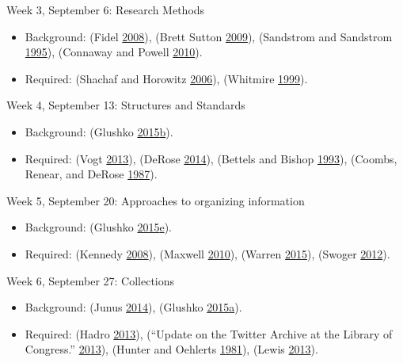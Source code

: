 \documentclass[]{article}
\providecommand{\tightlist}{%
  \setlength{\itemsep}{0pt}\setlength{\parskip}{0pt}}
\begin{document}
Week 3, September 6: Research Methods

\begin{itemize}
\tightlist
\item
  Background: (Fidel
  \protect\hyperlink{ref-fidelux5fareux5f2008}{2008}), (Brett Sutton
  \protect\hyperlink{ref-brettux5fsuttonux5fqualitativeux5f2009}{2009}),
  (Sandstrom and Sandstrom
  \protect\hyperlink{ref-sandstromux5fuseux5f1995}{1995}), (Connaway and
  Powell \protect\hyperlink{ref-connawayux5fselectingux5f2010}{2010}).
\item
  Required: (Shachaf and Horowitz
  \protect\hyperlink{ref-shachafux5fareux5f2006}{2006}), (Whitmire
  \protect\hyperlink{ref-whitmireux5fracialux5f1999}{1999}).
\end{itemize}

Week 4, September 13: Structures and Standards

\begin{itemize}
\tightlist
\item
  Background: (Glushko
  \protect\hyperlink{ref-glushkoux5fdescribingux5f2015}{2015}\protect\hyperlink{ref-glushkoux5fdescribingux5f2015}{b}).
\item
  Required: (Vogt
  \protect\hyperlink{ref-vogtux5fescienceux5f2013}{2013}), (DeRose
  \protect\hyperlink{ref-deroseux5fwhatux5f2014}{2014}), (Bettels and
  Bishop \protect\hyperlink{ref-bettelsux5funicode:ux5f1993}{1993}),
  (Coombs, Renear, and DeRose
  \protect\hyperlink{ref-coombsux5fmarkupux5f1987}{1987}).
\end{itemize}

Week 5, September 20: Approaches to organizing information

\begin{itemize}
\tightlist
\item
  Background: (Glushko
  \protect\hyperlink{ref-glushkoux5fresourcesux5f2015}{2015}\protect\hyperlink{ref-glushkoux5fresourcesux5f2015}{e}).
\item
  Required: (Kennedy
  \protect\hyperlink{ref-kennedyux5fnineux5f2008}{2008}), (Maxwell
  \protect\hyperlink{ref-maxwellux5fbibliographicux5f2010}{2010}),
  (Warren \protect\hyperlink{ref-warrenux5f2015ux5f2015}{2015}), (Swoger
  \protect\hyperlink{ref-swogerux5f.ux5f2012}{2012}).
\end{itemize}

Week 6, September 27: Collections

\begin{itemize}
\tightlist
\item
  Background: (Junus
  \protect\hyperlink{ref-junusux5fdigitalux5f2014}{2014}), (Glushko
  \protect\hyperlink{ref-glushkoux5factivitiesux5f2015}{2015}\protect\hyperlink{ref-glushkoux5factivitiesux5f2015}{a}).
\item
  Required: (Hadro
  \protect\hyperlink{ref-hadroux5fwhatsux5f2013}{2013}), (``Update on
  the Twitter Archive at the Library of Congress.''
  \protect\hyperlink{ref-ux5fupdateux5f2013}{2013}), (Hunter and
  Oehlerts \protect\hyperlink{ref-hunterux5ftwoux5f1981}{1981}), (Lewis
  \protect\hyperlink{ref-lewisux5fstacksux5f2013}{2013}).
\end{itemize}
\end{document}
